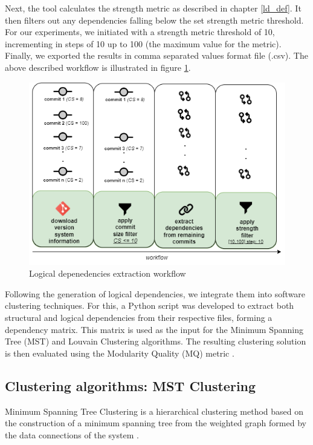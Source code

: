 \documentclass[conference]{IEEEtran}
\begin{document}
Next, the tool calculates the strength metric as described in chapter \ref{ld_def}. It then filters out any dependencies falling below the set strength metric threshold. For our experiments, we initiated with a strength metric threshold of 10, incrementing in steps of 10 up to 100 (the maximum value for the metric). Finally, we exported the results in comma separated values format file (.csv). The above described workflow is illustrated in figure \ref{fig:extraction}.


\begin{figure}
\centering
\includegraphics[width=\columnwidth]{dependencies-export.png}
\caption{Logical depenedencies extraction workflow}
\label{fig:extraction}
\centering
\end{figure}

Following the generation of logical dependencies, we integrate them into software clustering techniques. For this, a Python script was developed to extract both structural and logical dependencies from their respective files, forming a dependency matrix. This matrix is used as the input for the Minimum Spanning Tree (MST) and Louvain Clustering algorithms. The resulting clustering solution is then evaluated using the Modularity Quality (MQ) metric \cite{mqmetric}.

\subsection{Clustering algorithms: MST Clustering}
Minimum Spanning Tree Clustering is a hierarchical clustering method based on the construction of a minimum spanning tree from the weighted graph formed by the data connections of the system \cite{mst_clustering}.
\end{document}
